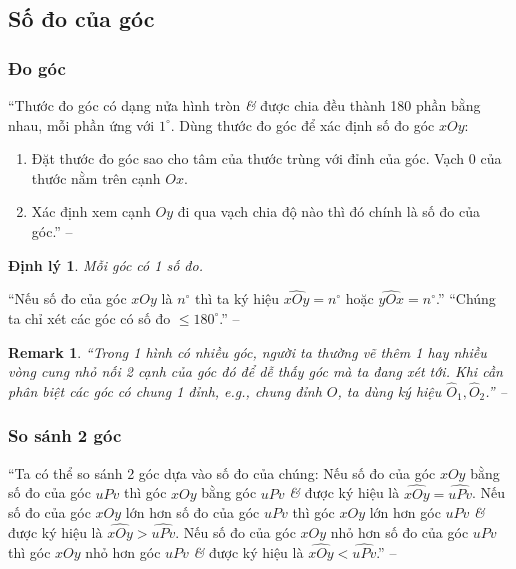 \documentclass[oneside]{book}
\numberwithin{equation}{section}
\newtheorem{remark}{Remark}[section]
\newtheorem{dinhly}{Định lý}[section]
\begin{document}
\subsection{Số đo của góc}

\subsubsection{Đo góc}
``Thước đo góc có dạng nửa hình tròn \textit{\&} được chia đều thành 180 phần bằng nhau, mỗi phần ứng với $1^\circ$. Dùng thước đo góc để xác định số đo góc $xOy$:
\begin{enumerate}
	\item Đặt thước đo góc sao cho tâm của thước trùng với đỉnh của góc. Vạch 0 của thước nằm trên cạnh $Ox$.
	\item Xác định xem cạnh $Oy$ đi qua vạch chia độ nào thì đó chính là số đo của góc.'' -- \cite[p. 96]{Thai_Anh_Dat_Ha_Loan_Nam_Quang_Toan_6_tap_2}
\end{enumerate}

\begin{dinhly}
	Mỗi góc có 1 số đo.
\end{dinhly}
``Nếu số đo của góc $xOy$ là $n^\circ$ thì ta ký hiệu $\widehat{xOy} = n^\circ$ hoặc $\widehat{yOx} = n^\circ$.'' ``Chúng ta chỉ xét các góc có số đo $\le 180^\circ$.'' -- \cite[p. 96]{Thai_Anh_Dat_Ha_Loan_Nam_Quang_Toan_6_tap_2}

\begin{remark}
	``Trong 1 hình có nhiều góc, người ta thường vẽ thêm 1 hay nhiều vòng cung nhỏ nối 2 cạnh của góc đó để dễ thấy góc mà ta đang xét tới. Khi cần phân biệt các góc có chung 1 đỉnh, e.g., chung đỉnh $O$, ta dùng ký hiệu $\widehat{O}_1,\widehat{O}_2$.'' -- \cite[p. 98]{Thai_Anh_Dat_Ha_Loan_Nam_Quang_Toan_6_tap_2}
\end{remark}

\subsubsection{So sánh 2 góc}
``Ta có thể so sánh 2 góc dựa vào số đo của chúng: Nếu số đo của góc $xOy$ bằng số đo của góc $uPv$ thì góc $xOy$ bằng góc $uPv$ \textit{\&} được ký hiệu là $\widehat{xOy} = \widehat{uPv}$. Nếu số đo của góc $xOy$ lớn hơn số đo của góc $uPv$ thì góc $xOy$ lớn hơn góc $uPv$ \textit{\&} được ký hiệu là $\widehat{xOy} > \widehat{uPv}$. Nếu số đo của góc $xOy$ nhỏ hơn số đo của góc $uPv$ thì góc $xOy$ nhỏ hơn góc $uPv$ \textit{\&} được ký hiệu là $\widehat{xOy} < \widehat{uPv}$.'' -- \cite[p. 98]{Thai_Anh_Dat_Ha_Loan_Nam_Quang_Toan_6_tap_2}
\end{document}
